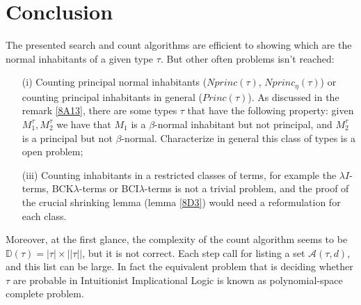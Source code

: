 \documentclass[a4paper,10pt]{article}
\begin{document}
\section{Conclusion}

The presented search and count algorithms are efficient to showing which are the 
normal inhabitants of a given type $\tau$. But other often problems isn't reached: 
\begin{itemize}
 \item [(i)] Counting principal normal inhabitants ($Nprinc(\tau)$, $Nprinc_{\eta}(\tau)$) or counting principal inhabitants in general ($Princ(\tau)$). 
 As discussed in the remark \ref{8A13}, there are some types $\tau$ that have the following property: 
 given $M_1^{\tau}, M_2^{\tau}$ we have that $M_1$ is a $\beta$-normal inhabitant but not principal, and $M_2^{\tau}$ is a principal but not $\beta$-normal.
 Characterize in general this class of types is a open problem;
 \item [(iii)] Counting inhabitants in a restricted classes of terms, for example the $\lambda I$-terms,
BCK$\lambda$-terms or BCI$\lambda$-terms is not a trivial problem, and the proof of the crucial shrinking lemma (lemma \ref{8D3}) would need a reformulation for each class.
\end{itemize}

Moreover, at the first glance, the complexity of the count algorithm seems to be $\mathbb{D}(\tau) = |\tau| \times ||\tau||$, but it is not correct.
Each step call for listing a set $\mathcal{A}(\tau, d)$, and this list can be large. In fact the equivalent problem that is deciding whether $\tau$ are probable in Intuitionist 
Implicational Logic is known as polynomial-space complete problem.
\end{document}
